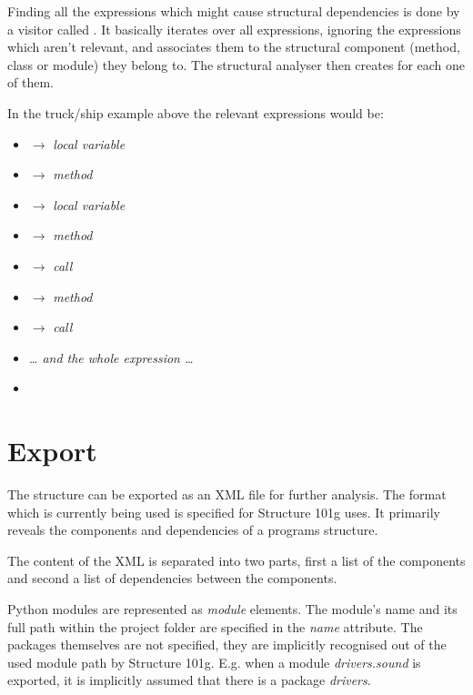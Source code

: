 \documentclass[12pt,halfparskip,DIV11,BCOR10mm]{scrreprt}
\begin{document}
Finding all the expressions which might cause structural dependencies is done by a visitor called . It basically iterates over all expressions, ignoring the expressions which aren't relevant, and associates them to the structural component (method, class or module) they belong to. The structural analyser then creates  for each one of them. 

In the truck/ship example above the relevant expressions would be:

\begin{itemize}
    \item {} $\rightarrow$ \emph{local variable}
    \item {} $\rightarrow$ \emph{method}
    \item {} $\rightarrow$ \emph{local variable}
    \item {} $\rightarrow$ \emph{method}
    \item {} $\rightarrow$ \emph{call}
    \item {} $\rightarrow$ \emph{method}
    \item {} $\rightarrow$ \emph{call}
    \item[] \emph{… and the whole expression …}
    \item {} 
\end{itemize}

\section{Export}

The structure can be exported as an XML file for further analysis. The format which is currently being used is specified for Structure 101g uses. It primarily reveals the components and dependencies of a programs structure. 

The content of the XML is separated into two parts, first a list of the components and second a list of dependencies between the components.

Python modules are represented as \emph{module} elements. The module's name and its full path within the project folder are specified in the \emph{name} attribute. The packages themselves are not specified, they are implicitly recognised out of the used module path by Structure 101g. E.g. when a module \emph{drivers.sound} is exported, it is implicitly assumed that there is a package \emph{drivers}.
\end{document}
